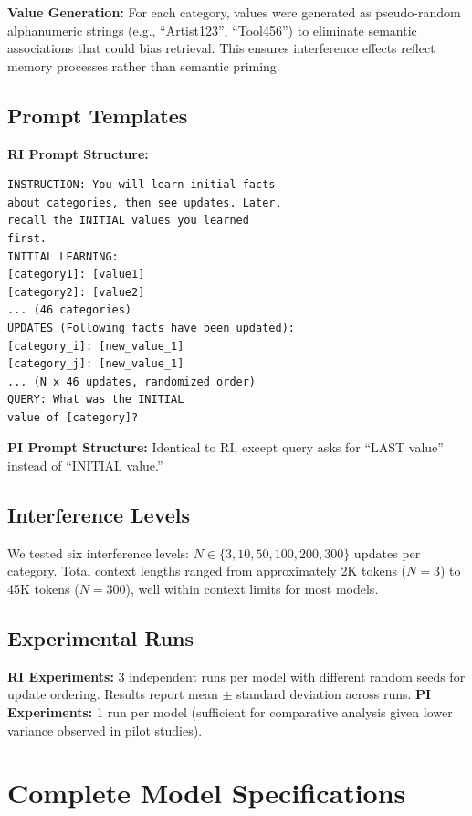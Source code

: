 \documentclass{article}
\begin{document}
\textbf{Value Generation:} For each category, values were generated as pseudo-random alphanumeric strings (e.g., ``Artist123'', ``Tool456'') to eliminate semantic associations that could bias retrieval. This ensures interference effects reflect memory processes rather than semantic priming.

\subsection{Prompt Templates}
\textbf{RI Prompt Structure:}
\vspace{-4pt}
{\footnotesize\begin{verbatim}
INSTRUCTION: You will learn initial facts
about categories, then see updates. Later,
recall the INITIAL values you learned
first.
INITIAL LEARNING:
[category1]: [value1]
[category2]: [value2]
... (46 categories)
UPDATES (Following facts have been updated):
[category_i]: [new_value_1]
[category_j]: [new_value_1]
... (N x 46 updates, randomized order)
QUERY: What was the INITIAL
value of [category]?
\end{verbatim}}
\vspace{-4pt}
\noindent\textbf{PI Prompt Structure:} Identical to RI, except query asks for ``LAST value'' instead of ``INITIAL value.''

\subsection{Interference Levels}
We tested six interference levels: $N \in \{3, 10, 50, 100, 200, 300\}$ updates per category. Total context lengths ranged from approximately 2K tokens ($N=3$) to 45K tokens ($N=300$), well within context limits for most models.

\subsection{Experimental Runs}
\textbf{RI Experiments:} 3 independent runs per model with different random seeds for update ordering. Results report mean $\pm$ standard deviation across runs.
\textbf{PI Experiments:} 1 run per model (sufficient for comparative analysis given lower variance observed in pilot studies).

\section{Complete Model Specifications}
\label{appendix:models}
\end{document}
